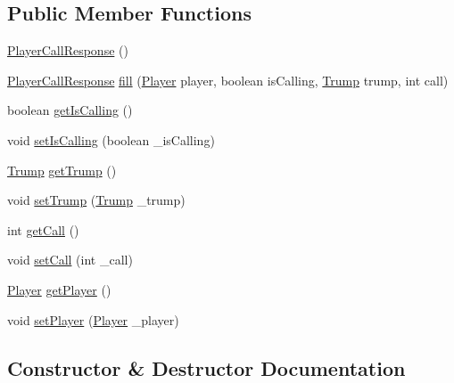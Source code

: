 \subsection*{Public Member Functions}
\begin{DoxyCompactItemize}
\item 
\mbox{\hyperlink{classCommon_1_1PlayerCallResponse_aa05af4c1843c3d7bf51ad6bdf0aad835}{Player\+Call\+Response}} ()
\item 
\mbox{\hyperlink{classCommon_1_1PlayerCallResponse}{Player\+Call\+Response}} \mbox{\hyperlink{classCommon_1_1PlayerCallResponse_a8273a7383a1b5c1bc459a1316b179709}{fill}} (\mbox{\hyperlink{classCommon_1_1Player}{Player}} player, boolean is\+Calling, \mbox{\hyperlink{enumCommon_1_1Trump}{Trump}} trump, int call)
\item 
boolean \mbox{\hyperlink{classCommon_1_1PlayerCallResponse_a902c88481b0437ae506fc8433714fe1f}{get\+Is\+Calling}} ()
\item 
void \mbox{\hyperlink{classCommon_1_1PlayerCallResponse_a4ae271562532326e9a46aaa44457c900}{set\+Is\+Calling}} (boolean \+\_\+is\+Calling)
\item 
\mbox{\hyperlink{enumCommon_1_1Trump}{Trump}} \mbox{\hyperlink{classCommon_1_1PlayerCallResponse_a7148bd90f3c12c061ca28a8adf168c48}{get\+Trump}} ()
\item 
void \mbox{\hyperlink{classCommon_1_1PlayerCallResponse_aa34a0f910c4f9a03e9fe89b3777d74c0}{set\+Trump}} (\mbox{\hyperlink{enumCommon_1_1Trump}{Trump}} \+\_\+trump)
\item 
int \mbox{\hyperlink{classCommon_1_1PlayerCallResponse_a97d10694feeea69a03ca9942ec9fe005}{get\+Call}} ()
\item 
void \mbox{\hyperlink{classCommon_1_1PlayerCallResponse_af6bee6cf9ac3d2d7151bfb44e4150827}{set\+Call}} (int \+\_\+call)
\item 
\mbox{\hyperlink{classCommon_1_1Player}{Player}} \mbox{\hyperlink{classCommon_1_1PlayerCallResponse_ab0d09ef4743979ff08016a7abeab3be5}{get\+Player}} ()
\item 
void \mbox{\hyperlink{classCommon_1_1PlayerCallResponse_a29ce25f8dcd0b7be9960fcde2d107db3}{set\+Player}} (\mbox{\hyperlink{classCommon_1_1Player}{Player}} \+\_\+player)
\end{DoxyCompactItemize}


\subsection{Constructor \& Destructor Documentation}
\mbox{\label{classCommon_1_1PlayerCallResponse_aa05af4c1843c3d7bf51ad6bdf0aad835}} 
